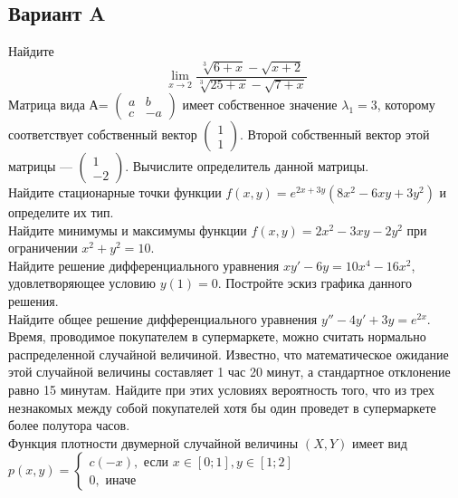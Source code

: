 \documentclass[addpoints, answers]{exam} %
\begin{document}
\subsection{Вариант A}
\begin{questions}

\question Найдите
\[
\lim_{x \to 2}\frac{\sqrt[3]{6+x}-\sqrt{x+2}}{\sqrt[3]{25+x}-\sqrt{7+x}}
\]
\question Матрица вида А=
$\left( \begin{array}{cc}
a & b\\
c & -a
\end{array} \right)$
имеет собственное значение $\lambda_1=3$, которому соответствует собственный вектор
$\left( \begin{array}{c}
1\\
1
\end{array} \right).$ Второй собственный вектор этой матрицы ---
$\left( \begin{array}{c}
1\\
-2
\end{array} \right).$
Вычислите определитель данной матрицы.\\
\question Найдите стационарные точки функции $f(x,y)=e^{2x+3y}(8x^2-6xy+3y^2)$ и определите их тип.\\
\question Найдите минимумы и максимумы функции $f(x,y)=2x^2-3xy-2y^2$ при ограничении $x^2+y^2=10$.\\
\question Найдите решение дифференциального уравнения $xy'-6y=10x^4-16x^2$, удовлетворяющее условию $y(1)=0$. Постройте эскиз графика данного решения. \\
\question Найдите общее решение дифференциального уравнения $y''-4y'+3y=e^{2x}$.\\
\question Время, проводимое покупателем в супермаркете, можно считать нормально распределенной случайной величиной. Известно, что математическое ожидание этой случайной величины составляет 1 час 20 минут, а стандартное отклонение равно 15 минутам. Найдите при этих условиях вероятность того, что из трех незнакомых между собой покупателей хотя бы один проведет в супермаркете более полутора часов.\\
\question Функция плотности двумерной случайной величины $(X,Y)$ имеет вид\\
$p(x,y)=\begin{cases}
c(-x),\text{ если } x\in [0;1],y \in [1;2]\\
0,\text{ иначе }
\end{cases}$\\


\end{questions}
\end{document}
